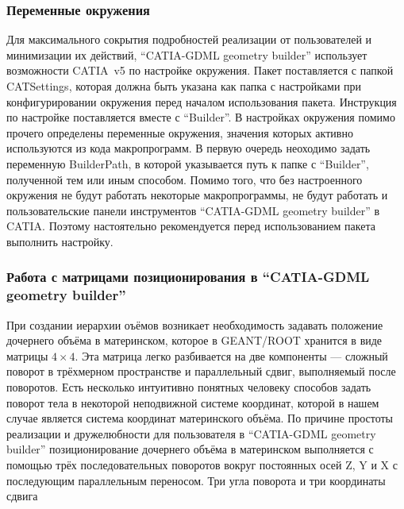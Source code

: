\subsubsection{Переменные окружения}\label{sec:secBuilderEnv}

Для максимального сокрытия подробностей реализации от пользователей и минимизации их действий, ``CATIA-GDML geometry builder'' использует возможности CATIA~v5 по настройке окружения. Пакет поставляется с папкой CATSettings, которая должна быть указана как папка с настройками при конфигурировании окружения перед началом использования пакета. Инструкция по настройке поставляется вместе с ``Builder''. В настройках окружения помимо прочего определены переменные окружения, значения которых активно используются из кода макропрограмм. В первую очередь неоходимо задать переменную BuilderPath, в которой указывается путь к папке с ``Builder'', полученной тем или иным способом. Помимо того, что без настроенного окружения не будут работать некоторые макропрограммы, не будут работать и пользовательские панели инструментов ``CATIA-GDML geometry builder'' в CATIA. Поэтому настоятельно рекомендуется перед использованием пакета выполнить настройку.

%                                        

\subsubsection{Работа с матрицами позиционирования в ``CATIA-GDML geometry builder''}\label{sec:secMatrices}

При создании иерархии оъёмов возникает необходимость задавать положение дочернего объёма в материнском, которое в GEANT/ROOT хранится в виде матрицы $4 \times 4$. Эта матрица легко разбивается на две компоненты --- сложный поворот в трёхмерном пространстве и параллельный сдвиг, выполняемый после поворотов. Есть несколько интуитивно понятных человеку способов задать поворот тела в некоторой неподвижной системе координат, которой в нашем случае является система координат материнского объёма. По причине простоты реализации и дружелюбности для пользователя в ``CATIA-GDML geometry builder'' позиционирование дочернего объёма в материнском выполняется с помощью трёх последовательных поворотов вокруг постоянных осей Z, Y и X с последующим параллельным переносом. Три угла поворота и три координаты сдвига


